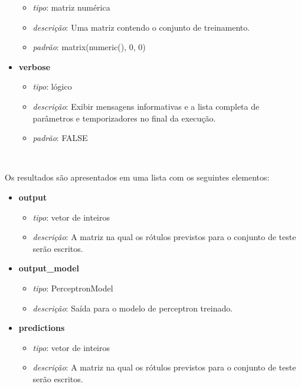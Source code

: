 \documentclass[
  a4paperpaper,
]{article}
\providecommand{\tightlist}{%
  \setlength{\itemsep}{0pt}\setlength{\parskip}{0pt}}\usepackage{longtable,booktabs,array}
\begin{document}
\begin{itemize}
  \begin{itemize}
  \tightlist
  \item
    \emph{tipo}: matriz numérica
  \item
    \emph{descrição}: Uma matriz contendo o conjunto de treinamento.
  \item
    \emph{padrão}: matrix(numeric(), 0, 0)
  \end{itemize}
\item
  \textbf{verbose}

  \begin{itemize}
  \tightlist
  \item
    \emph{tipo}: lógico
  \item
    \emph{descrição}: Exibir mensagens informativas e a lista completa
    de parâmetros e temporizadores no final da execução.
  \item
    \emph{padrão}: FALSE
  \end{itemize}
\end{itemize}

~

Os resultados são apresentados em uma lista com os seguintes elementos:

\begin{itemize}
\tightlist
\item
  \textbf{output}

  \begin{itemize}
  \tightlist
  \item
    \emph{tipo}: vetor de inteiros
  \item
    \emph{descrição}: A matriz na qual os rótulos previstos para o
    conjunto de teste serão escritos.
  \end{itemize}
\item
  \textbf{output\_model}

  \begin{itemize}
  \tightlist
  \item
    \emph{tipo}: PerceptronModel
  \item
    \emph{descrição}: Saída para o modelo de perceptron treinado.
  \end{itemize}
\item
  \textbf{predictions}

  \begin{itemize}
  \tightlist
  \item
    \emph{tipo}: vetor de inteiros
  \item
    \emph{descrição}: A matriz na qual os rótulos previstos para o
    conjunto de teste serão escritos.
  \end{itemize}
\end{itemize}
\end{document}
